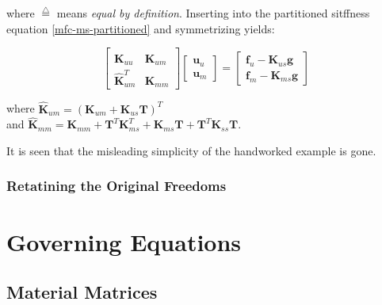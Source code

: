 \documentclass[10pt,b5paper,titlepage]{book}
\newcommand*\eqd{\stackrel{\triangle}{=}}
\begin{document}
where $ \eqd $ means \textit{equal by definition}. Inserting into the partitioned
sitffness equation \eqref{mfc-ms-partitioned} and symmetrizing yields:

\begin{equation}
    \begin{bmatrix}
        \mathbf{K}_{uu} & \mathbf{\hat{K}}_{um} \\
        \mathbf{\hat{K}}_{um}^T &
        \mathbf{\hat{K}}_{mm}
    \end{bmatrix}
    \begin{bmatrix}
        \mathbf{u}_u \\
        \mathbf{u}_m
    \end{bmatrix}
    = \begin{bmatrix}
        \mathbf{f}_u - \mathbf{K}_{us} \mathbf{g} \\
        \mathbf{f}_m - \mathbf{K}_{ms} \mathbf{g}
    \end{bmatrix}
\end{equation}

where $ \mathbf{\hat{K}}_{um} = \left( \mathbf{K}_{um} + \mathbf{K}_{us} \mathbf{T} \right)^T $ \\
and $ \mathbf{\hat{K}}_{mm} = \mathbf{K}_{mm} + \mathbf{T}^T \mathbf{K}_{ms}^T
+ \mathbf{K}_{ms} \mathbf{T} + \mathbf{T}^T \mathbf{K}_{ss} \mathbf{T} $.

It is seen that the misleading simplicity of the handworked example is gone.


\subsection{Retatining the Original Freedoms}





\newpage
\chapter{Governing Equations}

\section{Material Matrices}
\end{document}
